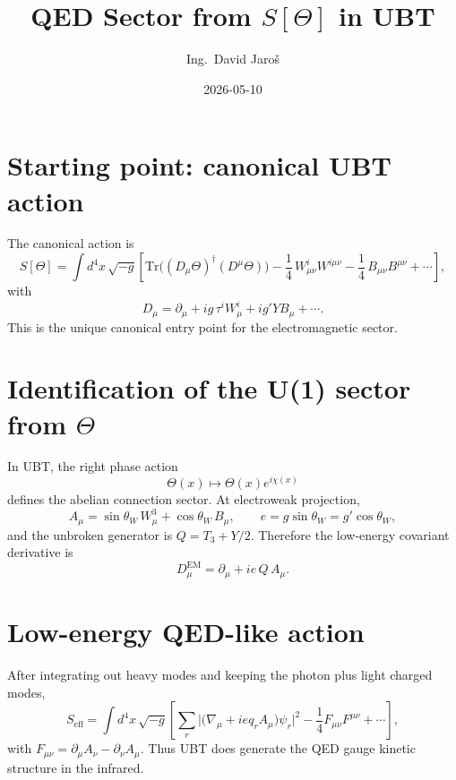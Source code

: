 \documentclass[11pt,a4paper]{article}
\title{QED Sector from \texorpdfstring{$S[\Theta]$}{S[Theta]} in UBT}
\author{Ing.\ David Jaroš}
\date{2026-05-10}
\begin{document}
\maketitle

\section{Starting point: canonical UBT action}
The canonical action is
\begin{equation}
S[\Theta]=\int d^4x\,\sqrt{-g}\left[
\mathrm{Tr}\big((D_\mu\Theta)^\dagger(D^\mu\Theta)\big)
-\frac14\,W^i_{\mu\nu}W^{i\mu\nu}
-\frac14\,B_{\mu\nu}B^{\mu\nu}
+\cdots\right],
\end{equation}
with
\begin{equation}
D_\mu=\partial_\mu+ig\,\tau^iW^i_\mu+ig'YB_\mu+\cdots.
\end{equation}
This is the unique canonical entry point for the electromagnetic sector.

\section{Identification of the U(1) sector from \texorpdfstring{$\Theta$}{Theta}}
In UBT, the right phase action
\begin{equation}
\Theta(x)\mapsto \Theta(x)e^{i\chi(x)}
\end{equation}
defines the abelian connection sector. At electroweak projection,
\begin{equation}
A_\mu=\sin\theta_W\,W^3_\mu+\cos\theta_W\,B_\mu,
\qquad
e=g\sin\theta_W=g'\cos\theta_W,
\end{equation}
and the unbroken generator is $Q=T_3+Y/2$.
Therefore the low-energy covariant derivative is
\begin{equation}
D^{\mathrm{EM}}_\mu=\partial_\mu+i e\,Q\,A_\mu.
\end{equation}

\section{Low-energy QED-like action}
After integrating out heavy modes and keeping the photon plus light charged modes,
\begin{equation}
S_{\mathrm{eff}}=\int d^4x\,\sqrt{-g}\left[
\sum_r \big|\big(\nabla_\mu+i e q_r A_\mu\big)\psi_r\big|^2
-\frac14 F_{\mu\nu}F^{\mu\nu}
+\cdots\right],
\end{equation}
with $F_{\mu\nu}=\partial_\mu A_\nu-\partial_\nu A_\mu$.
Thus UBT does generate the QED gauge kinetic structure in the infrared.
\end{document}
